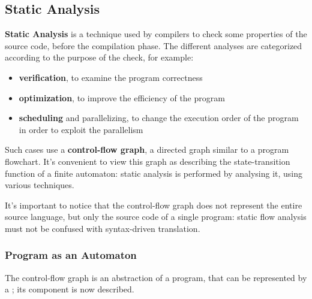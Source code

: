 \documentclass[english]{article}
\begin{document}
\subsection{Static Analysis}

\textbf{Static Analysis} is a technique used by compilers to check some properties of the source code, before the compilation phase.
The different analyses are categorized according to the purpose of the check, for example:

\begin{itemize}
  \item \textbf{verification}, to examine the program correctness
  \item \textbf{optimization}, to improve the efficiency of the program
  \item \textbf{scheduling} and parallelizing, to change the execution order of the program in order to exploit the parallelism
\end{itemize}

Such cases use a \textbf{control-flow graph}, a directed graph similar to a program flowchart.
It's convenient to view this graph as describing the state-transition function of a finite automaton:
static analysis is performed by analysing it, using various techniques.

It's important to notice that the control-flow graph does not represent the entire source language, but only the source code of a single program:
static flow analysis must not be confused with syntax-driven translation.

\subsubsection{Program as an Automaton}

The control-flow graph is an abstraction of a program, that can be represented by a \FSA;
its component is now described.
\end{document}
